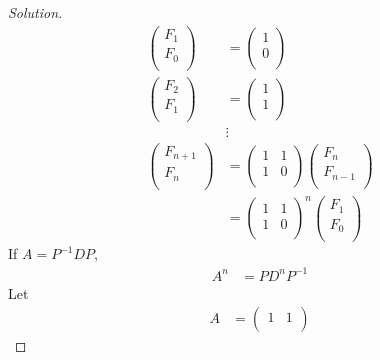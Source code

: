 \documentclass[fleqn, a4paper, 12pt]{article}
\theoremstyle{definition}
\theoremstyle{theorem}
\newenvironment{solution}
{\begin{proof}[Solution]\let\qed\relax}
	{\end{proof}}
\begin{document}
\begin{solution}
	\begin{align*}
		\begin{pmatrix}
			F_1\\
			F_0\\
		\end{pmatrix}
		&=
		\begin{pmatrix}
			1\\
			0\\
		\end{pmatrix}\\
		\begin{pmatrix}
			F_2\\
			F_1\\
			\end{pmatrix}
		&=
			\begin{pmatrix}
			1\\
			1\\
		\end{pmatrix}\\
		&\vdots\\
			\begin{pmatrix}
				F_{n + 1}\\
				F_n\\
			\end{pmatrix}
		&=
			\begin{pmatrix}
				1 & 1\\
				1 & 0\\
			\end{pmatrix}
			\begin{pmatrix}
				F_n\\
				F_{n - 1}\\
			\end{pmatrix}\\
		&= 			
			\begin{pmatrix}
				1 & 1\\
				1 & 0\\
			\end{pmatrix}^n
			\begin{pmatrix}
				F_1\\
				F_0\\
			\end{pmatrix}
	\end{align*}
	If $A = P^{-1} D P$,
	\begin{align*}
		A^n &= P D^n P^{-1}
	\end{align*}
	Let
	\begin{align*}
		A &= 
			\begin{pmatrix}
				1 & 1\\

\end{pmatrix}
\end{align*}
\end{solution}
\end{document}
